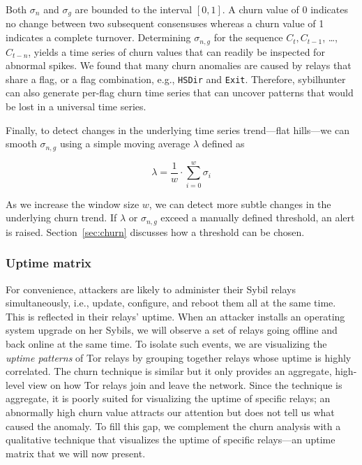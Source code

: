 Both $\sigma_{n}$ and $\sigma_{g}$ are bounded to the interval $[0, 1]$.  A
churn value of 0 indicates no change between two subsequent consensuses whereas
a churn value of 1 indicates a complete turnover.  Determining $\sigma_{n,g}$
for the sequence $C_{t}, C_{t-1}$, \ldots, $C_{t-n}$, yields a time series of
churn values that can readily be inspected for abnormal spikes.  We found that
many churn anomalies are caused by relays that share a flag, or a flag
combination, e.g., \texttt{HSDir} and \texttt{Exit}.  Therefore, sybilhunter can
also generate per-flag churn time series that can uncover patterns that would be
lost in a universal time series.

Finally, to detect changes in the underlying time series trend---flat hills---we
can smooth $\sigma_{n,g}$ using a simple moving average $\lambda$ defined as

\begin{equation}
\lambda = \frac{1}{w} \cdot \sum_{i=0}^{w} \sigma_{i}
\end{equation}

As we increase the window size $w$, we can detect more subtle changes in the
underlying churn trend.  If $\lambda$ or $\sigma_{n,g}$ exceed a manually
defined threshold, an alert is raised.  Section~\ref{sec:churn} discusses how a
threshold can be chosen.

\subsubsection{Uptime matrix}
\label{sec:uptime-matrix}
For convenience, attackers are likely to administer their Sybil relays
simultaneously, i.e., update, configure, and reboot them all at the same time.
This is reflected in their relays' uptime.  When an attacker installs an
operating system upgrade on her Sybils, we will observe a set of relays going
offline and back online at the same time.  To isolate such events, we are
visualizing the \emph{uptime patterns} of Tor relays by grouping together relays
whose uptime is highly correlated.  The churn technique is similar but it only
provides an aggregate, high-level view on how Tor relays join and leave the
network.  Since the technique is aggregate, it is poorly suited for visualizing
the uptime of specific relays; an abnormally high churn value attracts our
attention but does not tell us what caused the anomaly.  To fill this gap, we
complement the churn analysis with a qualitative technique that visualizes the
uptime of specific relays---an uptime matrix that we will now present.

